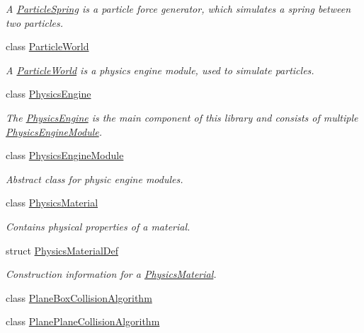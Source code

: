 \begin{DoxyCompactItemize}
\begin{DoxyCompactList}\small\item\em A \mbox{\hyperlink{classr3_1_1_particle_spring}{Particle\+Spring}} is a particle force generator, which simulates a spring between two particles. \end{DoxyCompactList}\item 
class \mbox{\hyperlink{classr3_1_1_particle_world}{Particle\+World}}
\begin{DoxyCompactList}\small\item\em A \mbox{\hyperlink{classr3_1_1_particle_world}{Particle\+World}} is a physics engine module, used to simulate particles. \end{DoxyCompactList}\item 
class \mbox{\hyperlink{classr3_1_1_physics_engine}{Physics\+Engine}}
\begin{DoxyCompactList}\small\item\em The \mbox{\hyperlink{classr3_1_1_physics_engine}{Physics\+Engine}} is the main component of this library and consists of multiple \mbox{\hyperlink{classr3_1_1_physics_engine_module}{Physics\+Engine\+Module}}. \end{DoxyCompactList}\item 
class \mbox{\hyperlink{classr3_1_1_physics_engine_module}{Physics\+Engine\+Module}}
\begin{DoxyCompactList}\small\item\em Abstract class for physic engine modules. \end{DoxyCompactList}\item 
class \mbox{\hyperlink{classr3_1_1_physics_material}{Physics\+Material}}
\begin{DoxyCompactList}\small\item\em Contains physical properties of a material. \end{DoxyCompactList}\item 
struct \mbox{\hyperlink{structr3_1_1_physics_material_def}{Physics\+Material\+Def}}
\begin{DoxyCompactList}\small\item\em Construction information for a \mbox{\hyperlink{classr3_1_1_physics_material}{Physics\+Material}}. \end{DoxyCompactList}\item 
class \mbox{\hyperlink{classr3_1_1_plane_box_collision_algorithm}{Plane\+Box\+Collision\+Algorithm}}
\item 
class \mbox{\hyperlink{classr3_1_1_plane_plane_collision_algorithm}{Plane\+Plane\+Collision\+Algorithm}}

\end{DoxyCompactItemize}
